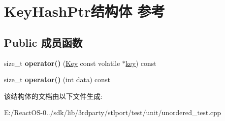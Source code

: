 \hypertarget{struct_key_hash_ptr}{}\section{Key\+Hash\+Ptr结构体 参考}
\label{struct_key_hash_ptr}
\subsection*{Public 成员函数}
\begin{DoxyCompactItemize}
\item 
\mbox{\label{struct_key_hash_ptr_a9b89d7f92ce781a9a437afcedb5a3911}} 
size\+\_\+t {\bfseries operator()} (\hyperlink{struct_key}{Key} const volatile $\ast$\hyperlink{structkey}{key}) const
\item 
\mbox{\label{struct_key_hash_ptr_a253572938d10c7e594ac7c782f08a14e}} 
size\+\_\+t {\bfseries operator()} (int data) const
\end{DoxyCompactItemize}


该结构体的文档由以下文件生成\+:\begin{DoxyCompactItemize}
\item 
E\+:/\+React\+O\+S-\/0../sdk/lib/3rdparty/stlport/test/unit/unordered\+\_\+test.\+cpp\end{DoxyCompactItemize}
